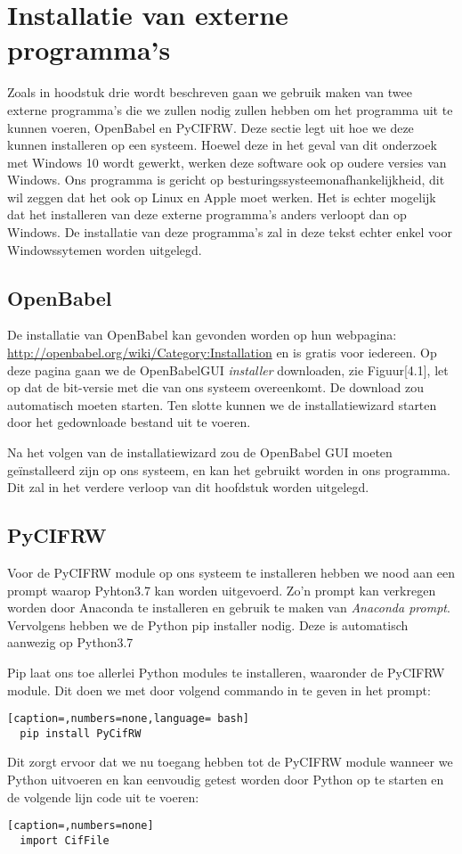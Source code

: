 \section{Installatie van externe programma's}
Zoals in hoodstuk drie wordt beschreven gaan we gebruik maken van twee externe programma's die we zullen nodig zullen hebben om het programma uit te kunnen voeren, OpenBabel en PyCIFRW. Deze sectie legt uit hoe we deze kunnen installeren op een systeem. Hoewel deze in het geval van dit onderzoek met Windows 10 wordt gewerkt, werken deze software ook op oudere versies van Windows. Ons programma is gericht op besturingssysteemonafhankelijkheid, dit wil zeggen dat het ook op Linux en Apple moet werken. Het is echter mogelijk dat het installeren van deze externe programma's anders verloopt dan op Windows. De installatie van deze programma's zal in deze tekst echter enkel voor Windowssytemen worden uitgelegd.

\subsection{OpenBabel}  
De installatie van OpenBabel kan gevonden worden op hun webpagina: \url{http://openbabel.org/wiki/Category:Installation} en is gratis voor iedereen. Op deze pagina gaan we de OpenBabelGUI \textit{installer} downloaden, zie Figuur[4.1], let op dat de bit-versie met die van ons systeem overeenkomt. De download zou automatisch moeten starten. Ten slotte kunnen we de installatiewizard starten door het gedownloade bestand uit te voeren.
\par
Na het volgen van de installatiewizard zou de OpenBabel GUI moeten geïnstalleerd zijn op ons systeem, en kan het gebruikt worden in ons programma. Dit zal in het verdere verloop van dit hoofdstuk worden uitgelegd.

\subsection{PyCIFRW}
Voor de PyCIFRW module op ons systeem te installeren hebben we nood aan een prompt waarop Pyhton3.7 kan worden uitgevoerd. Zo'n prompt kan verkregen worden door Anaconda te installeren en gebruik te maken van \textit{Anaconda prompt}. Vervolgens hebben we de Python pip installer nodig. Deze is automatisch aanwezig op Python3.7
\par 
Pip laat ons toe allerlei Python modules te installeren, waaronder de PyCIFRW module. Dit doen we met door volgend commando in te geven in het prompt:
\begin{lstlisting}[caption=,numbers=none,language= bash]
  pip install PyCifRW
\end{lstlisting}
Dit zorgt ervoor dat we nu toegang hebben tot de PyCIFRW module wanneer we Python uitvoeren en kan eenvoudig getest worden door Python op te starten en de volgende lijn code uit te voeren:
\begin{lstlisting}[caption=,numbers=none]
  import CifFile
\end{lstlisting}

